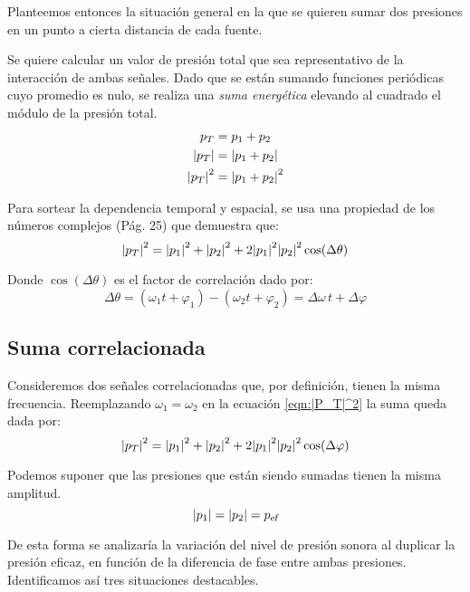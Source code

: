 \documentclass[a5paper,12pt,twoside]{book}
\begin{document}
Planteemos entonces la situación general en la que se quieren sumar dos presiones en un punto a cierta distancia de cada fuente.

Se quiere calcular un valor de presión total que sea representativo de la interacción de ambas señales.
Dado que se están sumando funciones periódicas cuyo promedio es nulo, se realiza una \emph{suma energética} elevando al cuadrado el módulo de la presión total.
\begin{align*}
    p_T &= p_1 + p_2
    \\
    {\left| {p_T} \right|} &= {\left| {p_1 + p_2} \right|}
    \\
    {\left| {p_T} \right|}^2 &= {\left| {p_1 + p_2} \right|}^2
\end{align*}

Para sortear la dependencia temporal y espacial, se usa una propiedad de los números complejos \cite{2} (Pág. 25) que demuestra que:
\begin{equation}
    {\left| {p_T} \right|}^2 = {\left| {p_1} \right|}^2 + {\left| {p_2} \right|}^2 + 2 {\left| {p_1} \right|}^2 {\left| {p_2} \right|}^2 \cos(\Delta \theta)
    \label{eqn:|P_T|^2}
\end{equation}

Donde $\cos(\Delta \theta)$ es el factor de correlación dado por:
\begin{equation*}
    \Delta \theta = \left( \omega_1 t + \varphi_1 \right) - \left( \omega_2 t + \varphi_2 \right) = \Delta \omega \, t + \Delta \varphi
\end{equation*}


\subsection{Suma correlacionada}

Consideremos dos señales correlacionadas que, por definición, tienen la misma frecuencia.
Reemplazando $\omega_1=\omega_2$ en la ecuación \ref{eqn:|P_T|^2} la suma queda dada por:
\begin{equation*}
    {\left| {p_T} \right|}^2 = {\left| {p_1} \right|}^2 + {\left| {p_2} \right|}^2 + 2 {\left| {p_1} \right|}^2 {\left| {p_2} \right|}^2 \cos(\Delta \varphi)
\end{equation*}

Podemos suponer que las presiones que están siendo sumadas tienen la misma amplitud.
\begin{equation*}
    {\left| {p_1} \right|} = {\left| {p_2} \right|} = {{{p}_\textsl{{ef}}}}
\end{equation*}

De esta forma se analizaría la variación del nivel de presión sonora al duplicar la presión eficaz, en función de la diferencia de fase entre ambas presiones.
Identificamos así tres situaciones destacables.
\end{document}

